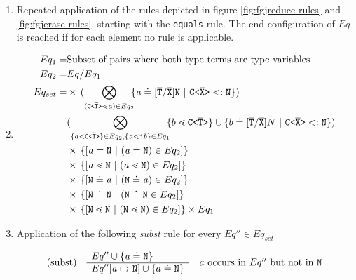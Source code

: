 \begin{enumerate}
\item Repeated application of the rules depicted in figure \ref{fig:fgjreduce-rules} and \ref{fig:fgjerase-rules},
starting with the \texttt{equals} rule.
The end configuration of $Eq$ is reached if for each element no rule is applicable.
\item
\begin{align*}
Eq_1 =& \text{Subset of pairs where both type terms are type variables}\\
Eq_2 =& Eq / Eq_1 \\
Eq_{set}
    = 
    & \times\, 
    (\displaystyle{\bigotimes_{(\exptype{C}{\overline{T}} \lessdot   \tv{a}) \in Eq_2}}\!\!
    \set{\tv{a} \doteq [\ol{T}/\ol{X}]\type{N} \ | \ \exptype{C}{\overline{X}} <: \type{N} })\\
    & (\displaystyle{\bigotimes_{\set{a \lessdot \exptype{C}{\overline{T}}} \in Eq_2, \set{ \tv{a} \lessdot^* \tv{b}} \in Eq_1}}\!\!
    \set{ b \lessdot \exptype{C}{\ol{T}}} \cup \set{b \doteq [\ol{T}/\ol{X}]N \ | \ \exptype{C}{\overline{X}} <: \type{N} })\\
    & \times\, \set{[\tv{a} \doteq \type{N} \ | \  (\tv{a} \doteq \type{N}) \in Eq_2]} \\
    & \times\, \set{[\tv{a} \lessdot \type{N} \ | \  (\tv{a} \lessdot \type{N}) \in Eq_2]}  \\
    & \times\, \set{[\type{N} \doteq \tv{a} \ | \  (\type{N} \doteq \tv{a}) \in Eq_2]}  \\
    & \times\, \set{[\type{N} \doteq \type{N} \ | \  (\type{N} \doteq \type{N} \in Eq_2]} \\
    & \times\, \set{[\type{N} \lessdot \type{N} \ | \  (\type{N} \lessdot \type{N}) \in Eq_2]} \times Eq_1 \\
\end{align*}
\item \label{subst-step}  Application of the following \emph{subst} rule for every $Eq'' \in Eq_{set}$
    
      $$\begin{array}[c]{lll}
        (\mathrm{subst}) &
        \begin{array}[c]{l}
          Eq'' \cup \{ \mathit{ a } \doteq \texttt{N} \}\\
          \hline
          Eq''[\mathit{ a } \mapsto \texttt{N}] \cup \{ a \doteq \texttt{N} \}
        \end{array}
        & \mathit{ a } \textrm{ occurs in } Eq'' \textrm{ but not in } \texttt{N}
      \end{array}$$
      

\end{enumerate}
